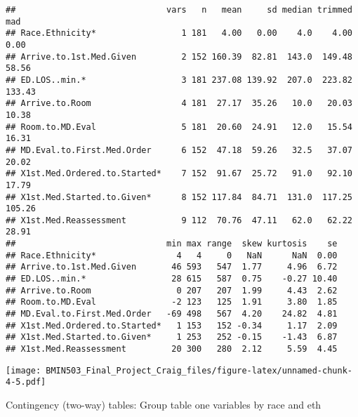\documentclass[]{article}
\newenvironment{Shaded}{\begin{snugshade}}{\end{snugshade}}
\newcommand{\KeywordTok}[1]{\textcolor[rgb]{0.13,0.29,0.53}{\textbf{#1}}}
\newcommand{\OperatorTok}[1]{\textcolor[rgb]{0.81,0.36,0.00}{\textbf{#1}}}
\newcommand{\NormalTok}[1]{#1}
\begin{document}
\begin{verbatim}
##                              vars   n   mean     sd median trimmed    mad
## Race.Ethnicity*                 1 181   4.00   0.00    4.0    4.00   0.00
## Arrive.to.1st.Med.Given         2 152 160.39  82.81  143.0  149.48  58.56
## ED.LOS..min.*                   3 181 237.08 139.92  207.0  223.82 133.43
## Arrive.to.Room                  4 181  27.17  35.26   10.0   20.03  10.38
## Room.to.MD.Eval                 5 181  20.60  24.91   12.0   15.54  16.31
## MD.Eval.to.First.Med.Order      6 152  47.18  59.26   32.5   37.07  20.02
## X1st.Med.Ordered.to.Started*    7 152  91.67  25.72   91.0   92.10  17.79
## X1st.Med.Started.to.Given*      8 152 117.84  84.71  131.0  117.25 105.26
## X1st.Med.Reassessment           9 112  70.76  47.11   62.0   62.22  28.91
##                              min max range  skew kurtosis    se
## Race.Ethnicity*                4   4     0   NaN      NaN  0.00
## Arrive.to.1st.Med.Given       46 593   547  1.77     4.96  6.72
## ED.LOS..min.*                 28 615   587  0.75    -0.27 10.40
## Arrive.to.Room                 0 207   207  1.99     4.43  2.62
## Room.to.MD.Eval               -2 123   125  1.91     3.80  1.85
## MD.Eval.to.First.Med.Order   -69 498   567  4.20    24.82  4.81
## X1st.Med.Ordered.to.Started*   1 153   152 -0.34     1.17  2.09
## X1st.Med.Started.to.Given*     1 253   252 -0.15    -1.43  6.87
## X1st.Med.Reassessment         20 300   280  2.12     5.59  4.45
\end{verbatim}

\begin{Shaded}
\end{Shaded}

\texttt{[image: BMIN503\_Final\_Project\_Craig\_files/figure-latex/unnamed-chunk-4-5.pdf]}

Contingency (two-way) tables: Group table one variables by race and eth
\end{document}
